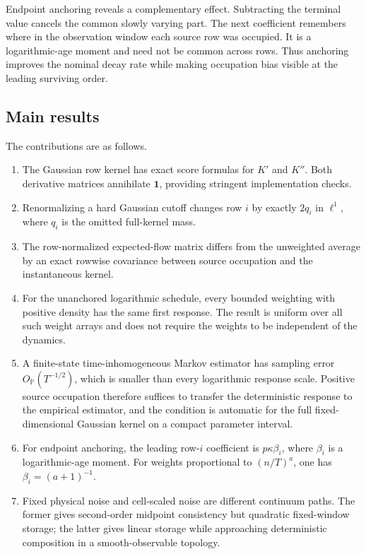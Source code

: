 \documentclass[11pt]{article}
\theoremstyle{definition}
\theoremstyle{remark}
\newcommand{\one}{\mathbf 1}
\begin{document}
Endpoint anchoring reveals a complementary effect.  Subtracting the terminal
value cancels the common slowly varying part.  The next coefficient remembers
where in the observation window each source row was occupied.  It is a
logarithmic-age moment and need not be common across rows.  Thus anchoring
improves the nominal decay rate while making occupation bias visible at the
leading surviving order.

\subsection*{Main results}

The contributions are as follows.

\begin{enumerate}[label=\textbf{R\arabic*.},leftmargin=3.2em]
  \item The Gaussian row kernel has exact score formulas for $K'$ and $K''$.
  Both derivative matrices annihilate $\one$, providing stringent
  implementation checks.

  \item Renormalizing a hard Gaussian cutoff changes row $i$ by exactly
  $2q_i$ in $\ell^1$, where $q_i$ is the omitted full-kernel mass.

  \item The row-normalized expected-flow matrix differs from the unweighted
  average by an exact rowwise covariance between source occupation and the
  instantaneous kernel.

  \item For the unanchored logarithmic schedule, every bounded weighting with
  positive density has the same first response.  The result is uniform over
  all such weight arrays and does not require the weights to be independent
  of the dynamics.

  \item A finite-state time-inhomogeneous Markov estimator has sampling error
  $O_{\mathbb P}(T^{-1/2})$, which is smaller than every logarithmic response
  scale.  Positive source occupation therefore suffices to transfer the
  deterministic response to the empirical estimator, and the condition is
  automatic for the full fixed-dimensional Gaussian kernel on a compact
  parameter interval.

  \item For endpoint anchoring, the leading row-$i$ coefficient is
  $p\kappa\beta_i$, where $\beta_i$ is a logarithmic-age moment.  For weights
  proportional to $(n/T)^a$, one has $\beta_i=(a+1)^{-1}$.

  \item Fixed physical noise and cell-scaled noise are different continuum
  paths.  The former gives second-order midpoint consistency but quadratic
  fixed-window storage; the latter gives linear storage while approaching
  deterministic composition in a smooth-observable topology.
\end{enumerate}
\end{document}
